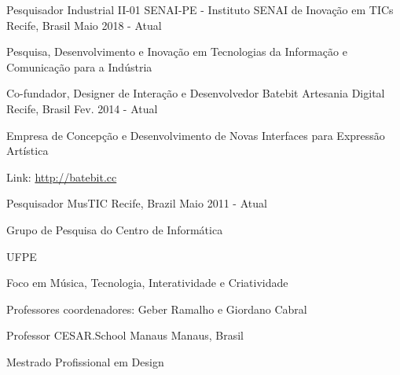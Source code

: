\begin{cventries}

\cventry
	{Pesquisador Industrial II-01}
	{SENAI-PE - Instituto SENAI de Inovação em TICs}
	{Recife, Brasil}
	{Maio 2018 - Atual}
	{\begin{cvitems}
		\item{Pesquisa, Desenvolvimento e Inovação em Tecnologias da Informação e Comunicação para a Indústria}
	\end{cvitems}}

\cventry
	{Co-fundador, Designer de Interação e Desenvolvedor}
	{Batebit Artesania Digital}
	{Recife, Brasil}
	{Fev. 2014 - Atual}
	{\begin{cvitems}
		\item{Empresa de Concepção e Desenvolvimento de Novas Interfaces para Expressão Artística}
		\item{Link: \href{http://batebit.cc}{http://batebit.cc}}
	\end{cvitems}}

\cventry
	{Pesquisador}
	{MusTIC}
	{Recife, Brazil}
	{Maio 2011 - Atual}
	{\begin{cvitems}
		\item{Grupo de Pesquisa do Centro de Informática}
		\item{UFPE}
		\item{Foco em Música, Tecnologia, Interatividade e Criatividade}
		\item{Professores coordenadores: Geber Ramalho e Giordano Cabral}
	\end{cvitems}}

\cventry
	{Professor}
	{CESAR.School Manaus}
	{Manaus, Brasil}
	{}
	{
	\begin{cvitems}
	    \item{Mestrado Profissional em Design}
	\end{cvitems}
	\begin{cvsubentries}
        \cvsubentry{}{}{}{}
    \end{cvsubentries}
    }


\end{cventries}
